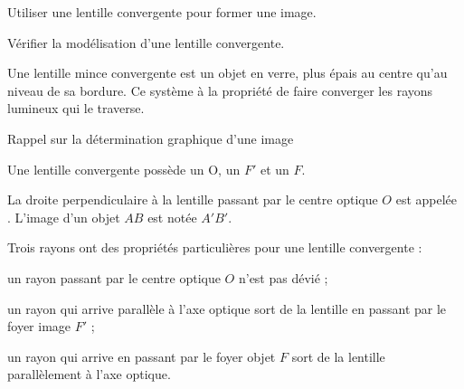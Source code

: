 \teteSndLumi

\vspace*{-36pt}


\begin{objectifs}
  \item Utiliser une lentille convergente pour former une image.
  \item Vérifier la modélisation d'une lentille convergente.
\end{objectifs}

\begin{contexte}
  Une lentille mince convergente est un objet en verre, plus épais au centre qu'au niveau de sa bordure.
  Ce système à la propriété de faire converger les rayons lumineux qui le traverse.
  
\end{contexte}
\bigskip


\begin{doc}{Rappel sur la détermination graphique d'une image}
  \label{doc:formation_image}
  \vspace*{-24pt}
  
  \begin{encart}
    Une lentille convergente possède un  O, un  $F'$ et un  $F$.
  \end{encart}
  La droite perpendiculaire à la lentille passant par le centre optique $O$ est appelée .
  L'image d'un objet $AB$ est notée $A'B'$.
  
  \begin{center}
  \end{center}
  
  \begin{encart}
    Trois rayons ont des propriétés particulières pour une lentille convergente :
    \begin{listePoints}
      \item un rayon passant par le centre optique $O$ n'est pas dévié ;
      \item un rayon qui arrive parallèle à l'axe optique sort de la lentille en passant par le foyer image $F'$ ;
      \item un rayon qui arrive en passant par le foyer objet $F$ sort de la lentille parallèlement à l'axe optique.
    \end{listePoints}
  \end{encart}
\end{doc}

